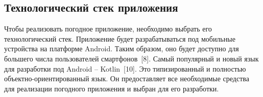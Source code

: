 \subsection{Технологический стек приложения}
Чтобы реализовать погодное приложение, необходимо выбрать его технологический стек.
Приложение будет разрабатываться под мобильные устройства на платформе Android.
Таким образом, оно будет доступно для большего числа пользователей смартфонов~[8].
Самый популярный и новый язык для разработки под Android -- Kotlin~[10].
Это типизированный и полностью объектно-ориентированный язык.
Он предоставляет все необходимые средства для реализации погодного приложения и выбран для его разработки.